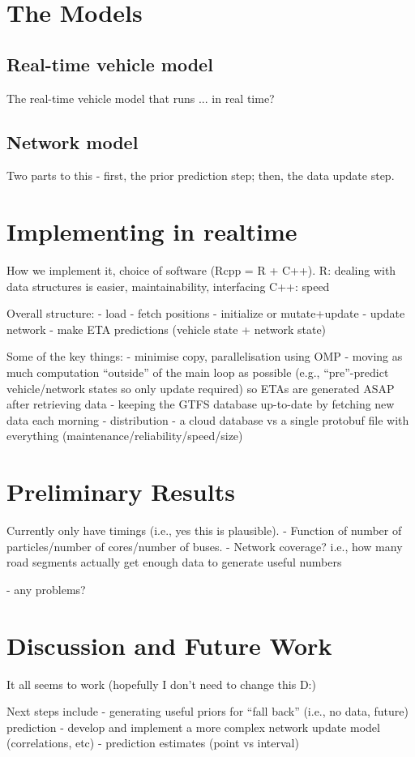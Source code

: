 \documentclass[times, doublespace]{anzsauth}
\begin{document}
\section{The Models}
\label{sec:models}

\subsection{Real-time vehicle model}
\label{sec:pf}

The real-time vehicle model that runs ... in real time?


\subsection{Network model}
\label{sec:kf}

Two parts to this - first, the prior prediction step; then, the data update step.


\section{Implementing in realtime}
\label{sec:rt}

How we implement it, choice of software (Rcpp = R + C++).
R: dealing with data structures is easier, maintainability, interfacing
C++: speed

Overall structure:
- load
- fetch positions
- initialize or mutate+update
- update network
- make ETA predictions (vehicle state + network state)

Some of the key things:
- minimise copy, parallelisation using OMP
- moving as much computation ``outside'' of the main loop as possible
  (e.g., ``pre''-predict vehicle/network states so only update required)
  so ETAs are generated ASAP after retrieving data
- keeping the GTFS database up-to-date by fetching new data each morning
- distribution - a cloud database vs a single protobuf file with everything 
  (maintenance/reliability/speed/size)


\section{Preliminary Results}
\label{sec:results}

Currently only have timings (i.e., yes this is plausible).
- Function of number of particles/number of cores/number of buses.
- Network coverage? i.e., how many road segments actually get enough data
to generate useful numbers

- any problems?


\section{Discussion and Future Work}
\label{sec:discussion}

It all seems to work (hopefully I don't need to change this D:)

Next steps include
- generating useful priors for ``fall back'' (i.e., no data, future) prediction
- develop and implement a more complex network update model (correlations, etc)
- prediction estimates (point vs interval)

\cite{Hans_2015}




\end{document}
